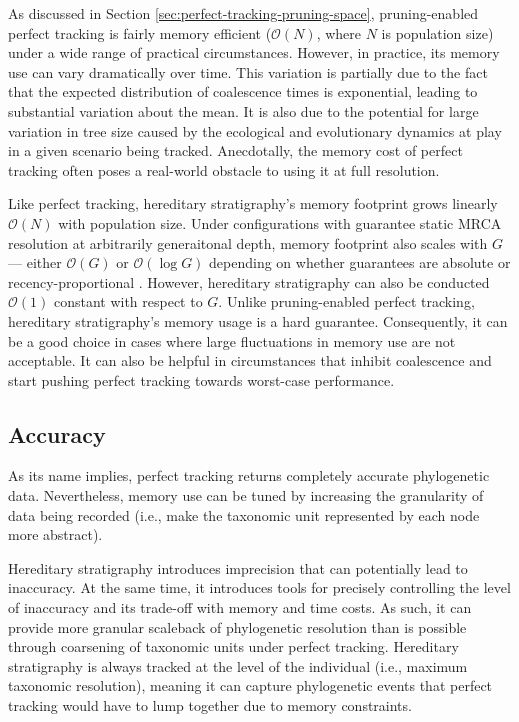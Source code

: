 As discussed in Section \ref{sec:perfect-tracking-pruning-space}, pruning-enabled perfect tracking is fairly memory efficient ($\mathcal{O}(N)$, where $N$ is population size) under a wide range of practical circumstances.
However, in practice, its memory use can vary dramatically over time.
This variation is partially due to the fact that the expected distribution of coalescence times is exponential, leading to substantial variation about the mean.
It is also due to the potential for large variation in tree size caused by the ecological and evolutionary dynamics at play in a given scenario being tracked.
Anecdotally, the memory cost of perfect tracking often poses a real-world obstacle to using it at full resolution.

Like perfect tracking, hereditary stratigraphy's memory footprint grows linearly $\mathcal{O}(N)$ with population size.
Under configurations with guarantee static MRCA resolution at arbitrarily generaitonal depth, memory footprint also scales with $G$ --- either $\mathcal{O}(G)$ or $\mathcal{O}(\log G)$ depending on whether guarantees are absolute or recency-proportional \citep{OTHERPREPRINT}.  %
However, hereditary stratigraphy can also be conducted $\mathcal{O}(1)$ constant with respect to $G$.
Unlike pruning-enabled perfect tracking, hereditary stratigraphy's memory usage is a hard guarantee.
Consequently, it can be a good choice in cases where large fluctuations in memory use are not acceptable.
It can also be helpful in circumstances that inhibit coalescence and start pushing perfect tracking towards worst-case performance.

\subsection{Accuracy}

As its name implies, perfect tracking returns completely accurate phylogenetic data.
Nevertheless, memory use can be tuned by increasing the granularity of data being recorded (i.e., make the taxonomic unit represented by each node more abstract).

Hereditary stratigraphy introduces imprecision that can potentially lead to inaccuracy.
At the same time, it introduces tools for precisely controlling the level of inaccuracy and its trade-off with memory and time costs.
As such, it can provide more granular scaleback of phylogenetic resolution than is possible through coarsening of taxonomic units under perfect tracking.
Hereditary stratigraphy is always tracked at the level of the individual (i.e., maximum taxonomic resolution), meaning it can capture phylogenetic events that perfect tracking would have to lump together due to memory constraints.

